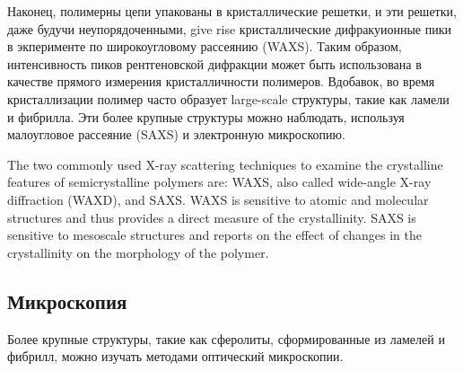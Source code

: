 Наконец, полимерны цепи упакованы в кристаллические решетки, и эти решетки, даже будучи неупорядоченными, give rise кристаллические дифракуионные пики в экперименте по широкоугловому рассеянию (WAXS). Таким образом, интенсивность пиков рентгеновской дифракции может быть использована в качестве прямого измерения кристалличности полимеров. Вдобавок, во время кристаллизации полимер часто образует large-scale структуры, такие как ламели и фибрилла. Эти более крупные структуры можно наблюдать, используя малоугловое рассеяние (SAXS) и электронную микроскопию.


The two commonly used X-ray scattering techniques to examine the crystalline
features of semicrystalline polymers are: WAXS, also called wide-angle X-ray
diffraction (WAXD), and SAXS. WAXS is sensitive to atomic and molecular structures
and thus provides a direct measure of the crystallinity. SAXS is sensitive to
mesoscale structures and reports on the effect of changes in the crystallinity on
the morphology of the polymer.\\

\subsection{Микроскопия}
Более крупные структуры, такие как сферолиты, сформированные из ламелей и фибрилл, можно изучать методами оптический микроскопии.

